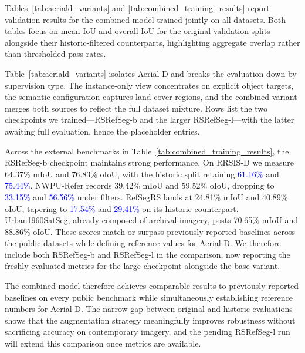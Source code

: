 Tables~\ref{tab:aeriald_variants} and \ref{tab:combined_training_results} report validation results for the combined model trained jointly on all datasets. Both tables focus on mean IoU and overall IoU for the original validation splits alongside their historic-filtered counterparts, highlighting aggregate overlap rather than thresholded pass rates.

Table~\ref{tab:aeriald_variants} isolates Aerial-D and breaks the evaluation down by supervision type. The instance-only view concentrates on explicit object targets, the semantic configuration captures land-cover regions, and the combined variant merges both sources to reflect the full dataset mixture. Rows list the two checkpoints we trained—RSRefSeg-b and the larger RSRefSeg-l—with the latter awaiting full evaluation, hence the placeholder entries.

Across the external benchmarks in Table~\ref{tab:combined_training_results}, the RSRefSeg-b checkpoint maintains strong performance. On RRSIS-D we measure 64.37\% mIoU and 76.83\% oIoU, with the historic split retaining \textcolor{blue}{61.16\%} and \textcolor{blue}{75.44\%}. NWPU-Refer records 39.42\% mIoU and 59.52\% oIoU, dropping to \textcolor{blue}{33.15\%} and \textcolor{blue}{56.56\%} under filters. RefSegRS lands at 24.81\% mIoU and 40.89\% oIoU, tapering to \textcolor{blue}{17.54\%} and \textcolor{blue}{29.41\%} on its historic counterpart. Urban1960SatSeg, already composed of archival imagery, posts 70.65\% mIoU and 88.86\% oIoU. These scores match or surpass previously reported baselines across the public datasets while defining reference values for Aerial-D. We therefore include both RSRefSeg-b and RSRefSeg-l in the comparison, now reporting the freshly evaluated metrics for the large checkpoint alongside the base variant.

The combined model therefore achieves comparable results to previously reported baselines on every public benchmark while simultaneously establishing reference numbers for Aerial-D. The narrow gap between original and historic evaluations shows that the augmentation strategy meaningfully improves robustness without sacrificing accuracy on contemporary imagery, and the pending RSRefSeg-l run will extend this comparison once metrics are available.

